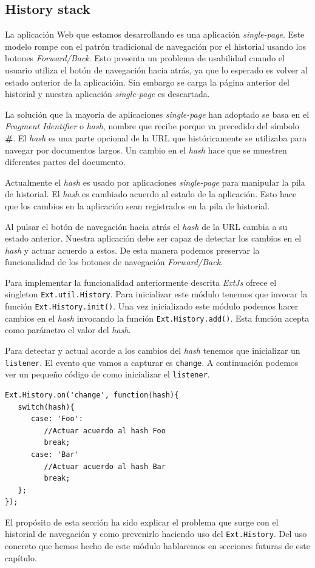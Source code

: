 	\subsection{History stack}
		La aplicación Web que estamos desarrollando es una aplicación \emph{single-page}. Este modelo rompe con el patrón tradicional de
		navegación por el historial usando los botones \emph{Forward/Back}. Esto presenta un problema de usabilidad cuando el usuario utiliza
		el botón de navegación hacia atrás, ya que lo esperado es volver al estado anterior de la aplicacióin. Sin embargo se carga la
		página anterior del historial y nuestra aplicación \emph{single-page} es descartada.
		\par
		La solución que la mayoría de aplicaciones \emph{single-page} han adoptado se basa en el \emph{Fragment Identifier}  o \emph{hash},
		nombre que recibe porque va precedido del símbolo \textbf{\#}. El \emph{hash} es una parte opcional de la URL que históricamente se
		utilizaba para navegar por documentos largos. Un cambio en el \emph{hash} hace que se muestren diferentes partes del documento.
		\par
		Actualmente el \emph{hash} es usado por aplicaciones \emph{single-page} para manipular la pila de historial. El \emph{hash} es cambiado
		acuerdo al estado de la aplicación. Esto hace que los cambios en la aplicación sean registrados en la pila de historial.
		\par
		Al pulsar el botón de navegación hacia atrás el \emph{hash} de la URL cambia a su estado anterior. Nuestra aplicación debe ser capaz
		de detectar los cambios en el \emph{hash} y actuar acuerdo a estos. De esta manera podemos preservar la funcionalidad de los botones
		de navegación \emph{Forward/Back}. 
		\par
		Para implementar la funcionalidad anteriormente descrita \emph{ExtJs} ofrece el singleton \texttt{Ext.util.History}. Para inicializar este
		módulo tenemos que invocar la función \texttt{Ext.History.init()}. Una vez inicializado este módulo podemos hacer cambios en el
		\emph{hash} invocando la función \texttt{Ext.History.add()}. Esta función acepta como parámetro el valor del \emph{hash}. 
		\par
		Para detectar y actual acorde a los cambios del \emph{hash} tenemos que inicializar un \texttt{listener}. El evento que vamos a
		capturar es \texttt{change}. A continuación podemos ver un pequeño código de como inicializar el \texttt{listener}.
		\begin{lstlisting}[style=myJs]
Ext.History.on('change', function(hash){
   switch(hash){
      case: 'Foo':
         //Actuar acuerdo al hash Foo
         break;
      case: 'Bar'
         //Actuar acuerdo al hash Bar
         break;
   };
});
		\end{lstlisting}
		\par
		El propósito de esta sección ha sido explicar el problema que surge con el historial de navegación y como prevenirlo haciendo uso del
		\texttt{Ext.History}. Del uso concreto que hemos hecho de este módulo hablaremos en secciones futuras de este capítulo.

